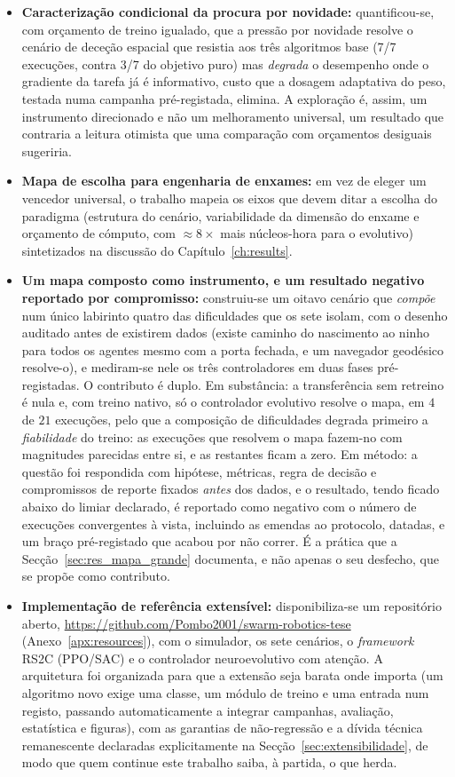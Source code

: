 \documentclass[12pt,reqno, twoside]{amsbook}
\theoremstyle{plain}
\numberwithin{equation}{chapter}
\numberwithin{section}{chapter}
\numberwithin{table}{chapter}
\numberwithin{figure}{chapter}
\begin{document}
\begin{itemize}
    \item \textbf{Caracterização condicional da procura por novidade:} quantificou-se, com orçamento de treino igualado, que a pressão por novidade resolve o cenário de deceção espacial que resistia aos três algoritmos base (7/7 execuções, contra 3/7 do objetivo puro) mas \emph{degrada} o desempenho onde o gradiente da tarefa já é informativo, custo que a dosagem adaptativa do peso, testada numa campanha pré-registada, elimina. A exploração é, assim, um instrumento direcionado e não um melhoramento universal, um resultado que contraria a leitura otimista que uma comparação com orçamentos desiguais sugeriria.
    \item \textbf{Mapa de escolha para engenharia de enxames:} em vez de eleger um vencedor universal, o trabalho mapeia os eixos que devem ditar a escolha do paradigma (estrutura do cenário, variabilidade da dimensão do enxame e orçamento de cómputo, com $\approx 8\times$ mais núcleos-hora para o evolutivo) sintetizados na discussão do Capítulo~\ref{ch:results}.
    \item \textbf{Um mapa composto como instrumento, e um resultado negativo reportado por compromisso:} construiu-se um oitavo cenário que \emph{compõe} num único labirinto quatro das dificuldades que os sete isolam, com o desenho auditado antes de existirem dados (existe caminho do nascimento ao ninho para todos os agentes mesmo com a porta fechada, e um navegador geodésico resolve-o), e mediram-se nele os três controladores em duas fases pré-registadas. O contributo é duplo. Em substância: a transferência sem retreino é nula e, com treino nativo, só o controlador evolutivo resolve o mapa, em $4$ de $21$ execuções, pelo que a composição de dificuldades degrada primeiro a \emph{fiabilidade} do treino: as execuções que resolvem o mapa fazem-no com magnitudes parecidas entre si, e as restantes ficam a zero. Em método: a questão foi respondida com hipótese, métricas, regra de decisão e compromissos de reporte fixados \emph{antes} dos dados, e o resultado, tendo ficado abaixo do limiar declarado, é reportado como negativo com o número de execuções convergentes à vista, incluindo as emendas ao protocolo, datadas, e um braço pré-registado que acabou por não correr. É a prática que a Secção~\ref{sec:res_mapa_grande} documenta, e não apenas o seu desfecho, que se propõe como contributo.
    \item \textbf{Implementação de referência extensível:} disponibiliza-se um repositório aberto, \url{https://github.com/Pombo2001/swarm-robotics-tese} (Anexo~\ref{apx:resources}), com o simulador, os sete cenários, o \textit{framework} RS2C (PPO/SAC) e o controlador neuroevolutivo com atenção. A arquitetura foi organizada para que a extensão seja barata onde importa (um algoritmo novo exige uma classe, um módulo de treino e uma entrada num registo, passando automaticamente a integrar campanhas, avaliação, estatística e figuras), com as garantias de não-regressão e a dívida técnica remanescente declaradas explicitamente na Secção~\ref{sec:extensibilidade}, de modo que quem continue este trabalho saiba, à partida, o que herda.
\end{itemize}
\end{document}
